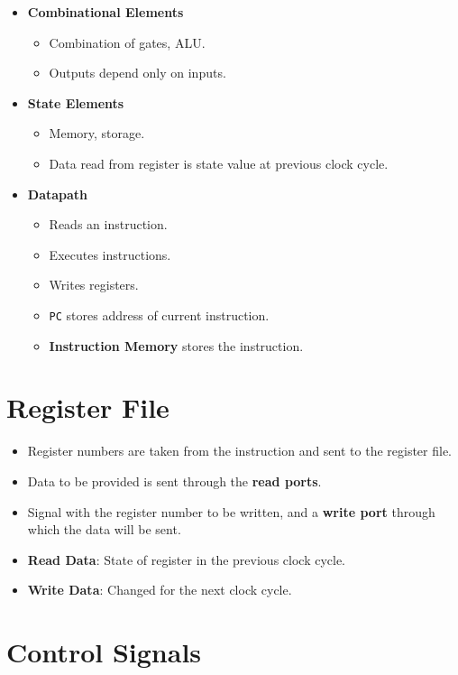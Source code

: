 \documentclass[12pt, letterpaper]{article}
\begin{document}
\begin{itemize}
  \item \textbf{Combinational Elements}
    \begin{itemize}
      \item Combination of gates, ALU.
      \item Outputs depend only on inputs.
    \end{itemize}
  \item \textbf{State Elements}
    \begin{itemize}
      \item Memory, storage.
      \item Data read from register is state value at previous clock cycle.
    \end{itemize}
  \item \textbf{Datapath}
    \begin{itemize}
      \item Reads an instruction.
      \item Executes instructions.
      \item Writes registers.
      \item \texttt{PC} stores address of current instruction.
      \item \textbf{Instruction Memory} stores the instruction.
    \end{itemize}
\end{itemize}

\section*{Register File}

\begin{itemize}
  \item Register numbers are taken from the instruction and sent to
    the register file.
  \item Data to be provided is sent through the \textbf{read ports}.
  \item Signal with the register number to be written, and a
    \textbf{write port} through which the data will be sent.
  \item \textbf{Read Data}: State of register in the previous clock cycle.
  \item \textbf{Write Data}: Changed for the next clock cycle.
\end{itemize}

\section*{Control Signals}
\end{document}
